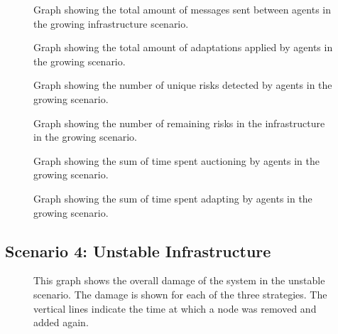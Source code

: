 \begin{figure}[H]
    \centering
    
    \caption{Graph showing the total amount of messages sent between agents in the growing infrastructure scenario.}
\end{figure}
\begin{figure}[H]
    \centering
    
    \caption{Graph showing the total amount of adaptations applied by agents in the growing scenario.}
\end{figure}
\begin{figure}[H]
    \centering
        
    \caption{Graph showing the number of unique risks detected by agents in the growing scenario.}
\end{figure}
\begin{figure}[H]
    \centering
        
    \caption{Graph showing the number of remaining risks in the infrastructure in the growing scenario.}
\end{figure}
\begin{figure}[H]
    \centering
        
    \caption{Graph showing the sum of time spent auctioning by agents in the growing scenario.}
\end{figure}
\begin{figure}[H]
    \centering
        
    \caption{Graph showing the sum of time spent adapting by agents in the growing scenario.}
\end{figure}

\subsection{Scenario 4: Unstable Infrastructure}
\begin{figure}[H]
    \centering
    
    \caption{This graph shows the overall damage of the system in the unstable scenario. The damage is shown for each of the three strategies. The vertical lines indicate the time at which a node was removed and added again.}
    \label{fig:overall-damage-unstable}
\end{figure}



